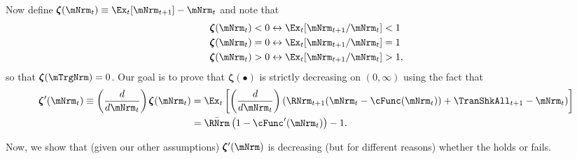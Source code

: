 \documentclass[\econtexRoot/BufferStockTheory]{subfiles}
\begin{document}
Now define \providecommand{\difFunc}{\pmb{\zeta}} $\difFunc(\mNrm_t) \equiv 
\Ex_t[\mNrm_{t+1}] - \mNrm_t$ and note that
\begin{equation}\begin{gathered}\begin{aligned}\label{eq:difNrmioEquiv}
  \difFunc(\mNrm_t) < 0 &\leftrightarrow \Ex_t[{\mNrm}_{t+1}/\mNrm_t] < 1 
                          \nonumber\\
  \difFunc(\mNrm_t) = 0 &\leftrightarrow \Ex_t[{\mNrm}_{t+1}/\mNrm_t] = 1\\
  \difFunc(\mNrm_t) > 0 &\leftrightarrow \Ex_t[{\mNrm}_{t+1}/\mNrm_t] > 
                          1,\nonumber
\end{aligned}\end{gathered}\end{equation}
so that $\difFunc(\mTrgNrm)=0$. Our goal is to prove that $\difFunc(\bullet)$ is strictly 
decreasing on $(0,\infty)$ using the fact that
\begin{equation}\begin{gathered}\begin{aligned}
  \difFunc^{\prime}(\mNrm_{t}) \equiv  \left( \frac{d}{d\mNrm_{t}}\right) \difFunc(\mNrm_t)  & = \Ex_{t}\left[
                                                                                               \left( \frac{d}{d\mNrm_{t}}\right) \left( 
                                                                                               {\RNrm}_{t+1}(\mNrm_{t}-\cFunc(\mNrm_{t}))+%
                                                                                               {\TranShkAll}_{t+1} - {\mNrm}_t\right) \right] \label{eq:difFuncmNrmDecreases} \\
                                                                                             & = \bar{\RNrm}\left(1-\cFunc^{\prime}({\mNrm}_t)\right) - 1.  \notag
\end{aligned}\end{gathered}\end{equation}

Now, we show that (given our other assumptions) $\difFunc^{\prime}(\mNrm)$ is decreasing (but for different reasons) whether the {\RIC} holds or fails.
\end{document}
